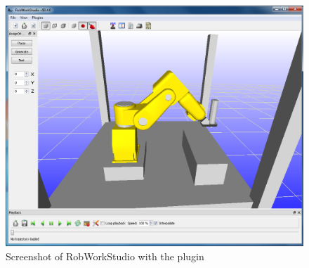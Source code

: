 \begin{figure}[H]
  \centering
  \includegraphics[scale= 0.4]{source/RobWorkStudioPlugin1.png}
  \caption{Screenshot of RobWorkStudio with the plugin}
  \label{fig:RobWPlug}
\end{figure}

